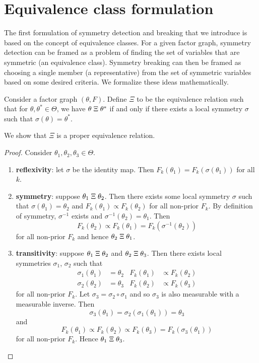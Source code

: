 

\section{Equivalence class formulation}

The first formulation of symmetry detection and breaking that we introduce is based on the concept of equivalence classes. For a given factor graph, symmetry detection can be framed as a problem of finding the set of variables that are symmetric (an equivalence class). Symmetry breaking can then be framed as choosing a single member (a representative) from the set of symmetric variables based on some desired criteria. We formalize these ideas mathematically.

\begin{defn}
Consider a factor graph $(\theta,F)$. Define $\Xi$ to be the equivalence relation such that for $\theta,\theta^*\in\Theta$, we have $\theta\;\Xi\;\theta^*$ if and only if there exists a local symmetry $\sigma$ such that $\sigma(\theta)=\theta^*$.
\end{defn}

\noindent We show that $\Xi$ is a proper equivalence relation.

\begin{proof}
Consider $\theta_1, \theta_2, \theta_3\in\Theta$.
\begin{enumerate}

\item
\textbf{reflexivity}: let $\sigma$ be the identity map. Then $F_k(\theta_1) = F_k(\sigma(\theta_1))$ for all $k$.

\item
\textbf{symmetry}: suppose $\theta_1\;\Xi\;\theta_2$. Then there exists some local symmetry $\sigma$ such that $\sigma(\theta_1)=\theta_2$ and $F_k(\theta_1) \propto F_k(\theta_2)$ for all non-prior $F_k$. By definition of symmetry, $\sigma^{-1}$ exists and $\sigma^{-1}(\theta_2)=\theta_1$. Then
\[
F_k(\theta_2) \propto F_k(\theta_1) = F_k(\sigma^{-1}(\theta_2))
\]
for all non-prior $F_k$ and hence $\theta_2\;\Xi\;\theta_1$.

\item
\textbf{transitivity}: suppose $\theta_1\;\Xi\;\theta_2$ and $\theta_2\;\Xi\;\theta_3$. Then there exists local symmetries $\sigma_1$, $\sigma_2$ such that
\begin{align*}
\sigma_1(\theta_1)&=\theta_2 & F_k(\theta_1)&\propto F_k(\theta_2) \\
\sigma_2(\theta_2)&=\theta_3 & F_k(\theta_2)&\propto F_k(\theta_3)
\end{align*}
for all non-prior $F_k$. Let $\sigma_3=\sigma_2\circ\sigma_1$ and so $\sigma_3$ is also measurable with a measurable inverse. Then
\[
\sigma_3(\theta_1)=\sigma_2(\sigma_1(\theta_1)) = \theta_3
\]
and
\[
F_k(\theta_1) \propto F_k(\theta_2) \propto F_k(\theta_3) = F_k(\sigma_3(\theta_1))
\]
for all non-prior $F_k$. Hence $\theta_1\;\Xi\;\theta_3$.

\end{enumerate}
\end{proof}

